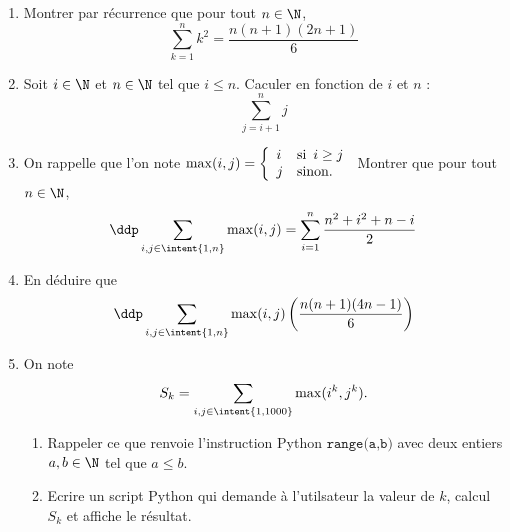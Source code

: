 



\begin{exercice}
\begin{enumerate}
\item Montrer par récurrence que pour tout $n\in \N$, 
$$ \sum_{k=1}^n  k^2= \frac{n(n+1)(2n+1)}{6}$$

\item Soit $i\in \N$ et $n\in \N$ tel que $i\leq n$. Caculer en fonction de $i$ et $n$ :
$$\sum_{j=i+1}^n j$$

\item 
On rappelle que l'on note $\max(i,j) =  \left\{
    \begin{array}{ll}
       i & \text{si\, } i \geq j \\
        j & \mbox{sinon.}
    \end{array}
\right.
$
Montrer que pour tout $n\in \N$, $$\ddp \sum_{i,j\in \intent{1,n}} \max(i,j)  = \sum_{i=1}^n \frac{n^2+i^2 +n-i}{2}$$ 
\item En déduire que 
$$\ddp \sum_{i,j\in \intent{1,n}} \max(i,j) \left(   \frac{n(n+1)(4n-1)}{6} \right)	 $$

\item On note $$S_k =  \sum_{i,j\in \intent{1,1000}} \max(i^k,j^k).$$ 
\begin{enumerate}
\item Rappeler ce que renvoie l'instruction Python $\texttt{range(a,b)}$ avec deux entiers $a,b\in \N$ tel que $a\leq b$.
\item Ecrire un script Python qui demande à l'utilsateur la valeur de $k$, calcul $S_k$ et affiche le résultat. 
\end{enumerate}
\end{enumerate}
\end{exercice}



